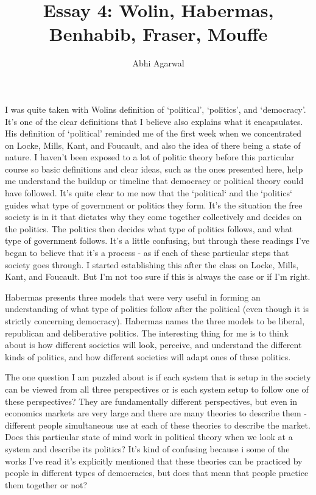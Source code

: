 \documentclass[11pt, oneside]{article}
\title{Essay 4: Wolin, Habermas, Benhabib, Fraser, Mouffe}
\author{Abhi Agarwal}
\date{}
\begin{document}
\maketitle

\par I was quite taken with Wolins definition of `political', `politics', and `democracy'. It's one of the clear definitions that I believe also explains what it encapsulates. His definition of `political' reminded me of the first week when we concentrated on Locke, Mills, Kant, and Foucault, and also the idea of there being a state of nature. I haven't been exposed to a lot of politic theory before this particular course so basic definitions and clear ideas, such as the ones presented here, help me understand the buildup or timeline that democracy or political theory could have followed. It's quite clear to me now that the `political` and the `politics` guides what type of government or politics they form. It's the situation the free society is in it that dictates why they come together collectively and decides on the politics. The politics then decides what type of politics follows, and what type of government follows. It's a little confusing, but through these readings I've began to believe that it's a process - as if each of these particular steps that society goes through. I started establishing this after the class on Locke, Mills, Kant, and Foucault. But I'm not too sure if this is always the case or if I'm right.

\par Habermas presents three models that were very useful in forming an understanding of what type of politics follow after the political (even though it is strictly concerning democracy). Habermas names the three models to be liberal, republican and deliberative politics. The interesting thing for me is to think about is how different societies will look, perceive, and understand the different kinds of politics, and how different societies will adapt ones of these politics. 

\par The one question I am puzzled about is if each system that is setup in the society can be viewed from all three perspectives or is each system setup to follow one of these perspectives? They are fundamentally different perspectives, but even in economics markets are very large and there are many theories to describe them - different people simultaneous use at each of these theories to describe the market. Does this particular state of mind work in political theory when we look at a system and describe its politics? It's kind of confusing because i some of the works I've read it's explicitly mentioned that these theories can be practiced by people in different types of democracies, but does that mean that people practice them together or not?
\end{document}
